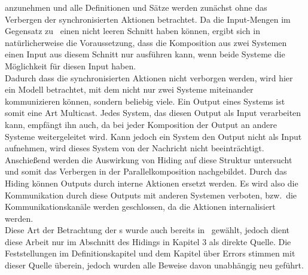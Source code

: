 anzunehmen und alle Definitionen und Sätze werden zunächst ohne das
Verbergen der synchronisierten Aktionen betrachtet. Da die Input-Mengen im
Gegensatz zu~\cite{Vogler2014EIO} einen
nicht leeren Schnitt haben können, ergibt sich in natürlicherweise die
Voraussetzung, dass die Komposition
aus zwei Systemen einen Input aus diesem Schnitt nur ausführen kann, wenn beide
Systeme die Möglichkeit für diesen Input haben.\\
Dadurch dass die synchronisierten Aktionen nicht verborgen werden, wird hier
ein Modell betrachtet, mit dem nicht nur zwei Systeme miteinander kommunizieren können,
sondern beliebig viele. Ein Output eines Systems ist somit eine Art Multicast.
Jedes System, das diesen Output als Input verarbeiten kann, empfängt ihn auch,
da bei jeder Komposition der Output an andere Systeme weitergeleitet wird.
Kann jedoch ein System den Output nicht als Input aufnehmen, wird dieses System von
der Nachricht nicht beeinträchtigt.\\
Anschießend werden die Auswirkung von Hiding auf diese Struktur
untersucht und somit das Verbergen in der Parallelkomposition nachgebildet.
Durch das Hiding können Outputs durch interne Aktionen ersetzt werden. Es wird
also die Kommunikation durch diese Outputs mit anderen Systemen verboten, bzw.\
die Kommunikationskanäle werden geschlossen, da die Aktionen internalisiert
werden.\\
Diese Art der Betrachtung der
\EIO{}s wurde auch bereits in~\cite{Schlosser2012BA} gewählt, jedoch dient
diese Arbeit nur im Abschnitt des Hidings in Kapitel 3 als direkte Quelle. Die Feststellungen im Definitionskapitel und dem Kapitel über
Errors stimmen mit dieser Quelle überein, jedoch wurden alle Beweise davon unabhängig neu
geführt.

